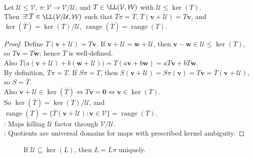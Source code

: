 \begin{theorem} \label{thm:quotient-universal-property} \label{thm:quotient-factorisation-through-projection} \\
Let $\mathcal{U}\leq\mathcal{V}$, $\pi:\mathcal{V}\to\mathcal{V}/\mathcal{U}$, and $T\in\LL(\mathcal{V},\mathcal{W})$ with $\mathcal{U}\leq\ker(T)$.\\
Then $\exists!\,\overline{T}\in\LL(\mathcal{V}/\mathcal{U},\mathcal{W})
$ such that $\overline{T}\pi=T$, $\overline{T}(\mathbf{v}+\mathcal{U})=T\mathbf{v}$, and $\ker(\overline{T})=\ker(T)/\mathcal{U}$, $\operatorname{range}(\overline{T})=\operatorname{range}(T)$.
\begin{proof}
Define $\overline{T}(\mathbf{v}+\mathcal{U})=T\mathbf{v}$. If $\mathbf{v}+\mathcal{U}=\mathbf{w}+\mathcal{U}$, then $\mathbf{v}-\mathbf{w}\in\mathcal{U}\leq\ker(T)$, so $T\mathbf{v}=T\mathbf{w}$; hence $\overline{T}$ is well-defined.\\
Also $\overline{T}\big(a(\mathbf{v}+\mathcal{U})+b(\mathbf{w}+\mathcal{U})\big) =T(a\mathbf{v}+b\mathbf{w}) =aT\mathbf{v}+bT\mathbf{w}$.\\
By definition, $\overline{T}\pi=T$. If $S\pi=T$, then $S(\mathbf{v}+\mathcal{U})=S\pi(\mathbf{v})=T\mathbf{v}=\overline{T}(\mathbf{v}+\mathcal{U})$, so $S=\overline{T}$.\\
Also $\mathbf{v}+\mathcal{U}\in\ker(\overline{T}) \Longleftrightarrow T\mathbf{v}=\mathbf{0} \Longleftrightarrow \mathbf{v}\in\ker(T)$.\\
So $\ker(\overline{T})=\ker(T)/\mathcal{U}$, and $\operatorname{range}(\overline{T})=\{\overline{T}(\mathbf{v}+\mathcal{U}):\mathbf{v}\in\mathcal{V}\}=\operatorname{range}(T)$.\\
: Maps killing $\mathcal{U}$ factor through $\mathcal{V}/\mathcal{U}$.\\
: Quotients are universal domains for maps with prescribed kernel ambiguity.
\end{proof}
\end{theorem}

\begin{figure}[H]
  \centering
  
  \caption{If $\mathcal{U}\subseteq\ker(L)$, then $L=\overline{L}\pi$ uniquely.}
  \label{fig:quotient-universal-property}
\end{figure}

